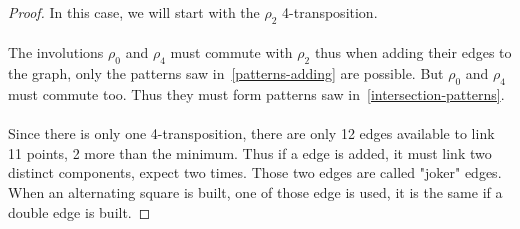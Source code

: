 \begin{proof}
  In this case, we will start with the $\rho_2$ 4-transposition.

  \begin{figure}[H]
    \begin{center}
      \caption{}
    \end{center}
  \end{figure}

\paragraph{}
The involutions $\rho_0$ and $\rho_4$ must commute with $\rho_2$ thus when adding their edges to the graph, only the patterns saw in~\ref{patterns-adding} are possible. But $\rho_0$ and $\rho_4$ must commute too. Thus they must form patterns saw in~\ref{intersection-patterns}.

\paragraph{}
Since there is only one 4-transposition, there are only 12 edges available to link 11 points, 2 more than the minimum. Thus if a edge is added, it must link two distinct components, expect two times. Those two edges are called "joker" edges. When an alternating square is built, one of those edge is used, it is the same if a double edge is built.


\end{proof}
